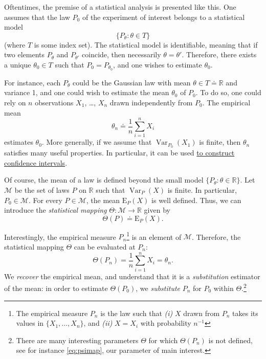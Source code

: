 \documentclass[
  11pt,
  openright,twoside]{book}
\DeclareMathOperator{\Var}{Var}
\newcommand{\bbR}{\mathbb{R}}
\newcommand{\defq}{\doteq}
\newcommand{\calM}{\mathcal{M}}
\newcommand{\Exp}{\textrm{E}}
\theoremstyle{definition}
\theoremstyle{definition}
\theoremstyle{definition}
\theoremstyle{definition}
\theoremstyle{remark}
\begin{document}
Oftentimes, the premise of a statistical analysis is presented like this. One
assumes that the law \(P_{0}\) of the experiment of interest belongs to a
statistical model \begin{equation*}\{P_{\theta}     :    \theta     \in
T\}\end{equation*} (where \(T\) is some index set). The statistical model is identifiable, meaning that if two
elements \(P_{\theta}\) and \(P_{\theta'}\) coincide, then necessarily \(\theta = \theta'\). Therefore, there exists a unique \(\theta_{0} \in T\) such that
\(P_{0} = P_{\theta_{0}}\), and one wishes to estimate
\(\theta_{0}\).

For instance, each \(P_{\theta}\) could be the Gaussian law with mean \(\theta \in T \defq \bbR\) and variance 1, and one could wish to estimate the mean
\(\theta_{0}\) of \(P_{0}\). To do so, one could rely on \(n\) observations \(X_{1}\),
\ldots, \(X_{n}\) drawn independently from \(P_{0}\). The empirical mean
\begin{equation*}\theta_{n}       \defq      \frac{1}{n}       \sum_{i=1}^{n}
X_{i}\end{equation*} estimates \(\theta_{0}\). More generally, if we assume that \(\Var_{P_{0}} (X_{1})\) is finite, then \(\theta_{n}\) satisfies many useful properties. In
particular, it can be used \protect\hyperlink{clt}{to construct confidence intervals}.

Of course, the mean of a law is defined beyond the small model \(\{P_{\theta} : \theta \in \bbR\}\). Let \(\calM\) be the set of laws \(P\) on \(\bbR\) such that
\(\Var_{P}(X)\) is finite. In particular, \(P_{0} \in \calM\). For every \(P \in \calM\), the mean \(\Exp_{P}(X)\) is well defined. Thus, we can introduce the
\emph{statistical mapping} \(\Theta : \calM \to \bbR\) given by
\begin{equation*}\Theta(P) \defq \Exp_{P}(X).\end{equation*}

Interestingly, the empirical measure \(P_{n}\)\footnote{The empirical measure \(P_{n}\) is
  the law such that \emph{(i)} \(X\) drawn from \(P_{n}\) takes its values in \(\{X_{1}, \ldots, X_{n}\}\), and \emph{(ii)} \(X=X_{i}\) with probability \(n^{-1}\)} is an
element of \(\calM\). Therefore, the statistical mapping \(\Theta\) can be
evaluated at \(P_{n}\): \begin{equation*}\Theta(P_{n})    =   \frac{1}{n}
\sum_{i=1}^{n} X_{i}  = \theta_{n}.\end{equation*} We \emph{recover} the empirical
mean, and understand that it is a \emph{substitution} estimator of the mean: in
order to estimate \(\Theta(P_{0})\), we \emph{substitute} \(P_{n}\) for \(P_{0}\) within
\(\Theta\).\footnote{There are many interesting parameters \(\Theta\) for which
  \(\Theta(P_n)\) is not defined, see for instance \eqref{eq:psimap}, our parameter
  of main interest.}
\end{document}
